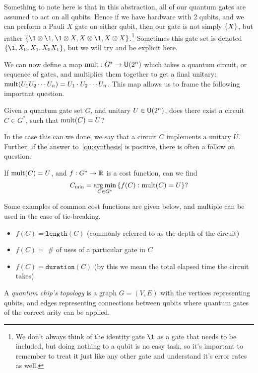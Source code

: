 Something to note here is that in this abstraction, all of our quantum gates are assumed to act on all qubits.
Hence if we have hardware with 2 qubits, and we can perform a Pauli $X$ gate on either qubit, then our gate is not simply $\qty{X}$, but rather $\qty{\1\otimes \1, \1\otimes X, X\otimes \1, X\otimes X}$.\footnote{We don't always think of the identity gate $\1$ as a gate that needs to be included, but doing nothing to a qubit is no easy task, so it's important to remember to treat it just like any other gate and understand it's error rates as well.}
Sometimes this gate set is denoted $\qty{\1, X_0, X_1, X_0X_1}$, but we will try and be explicit here.

We can now define a map $\operatorname{mult}: G^* \to \mathsf{U} (2^n)$ which takes a quantum circuit, or sequence of gates, and multiplies them together to get a final unitary: $\operatorname{mult}(U_1U_2\cdots U_n) = U_1\cdot U_2\cdots U_n$.
This map allows us to frame the following important question.

\begin{question}\label{qu:synthesis}
    Given a quantum gate set $G$, and unitary $U\in\mathsf{U} (2^n)$, does there exist a circuit $C\in G^*$, such that $\operatorname{mult}(C) = U$?
\end{question}
In the case this can we done, we say that a circuit $C$ implements a unitary $U$.
Further, if the answer to~\ref{qu:synthesis} is positive, there is often a follow on question.
\begin{question}\label{qu:optimalsynthesis}
    If $\operatorname{mult}(C) = U$, and $f: G^* \to \mathbb{R}$ is a cost function, can we find
    \begin{equation*}
        C_\text{min} = \operatorname*{arg\,min}_{C\in G^*} \qty{f(C) : \operatorname{mult}(C) = U}?
    \end{equation*}
\end{question}
Some examples of common cost functions are given below, and multiple can be used in the case of tie-breaking.
\begin{itemize}
    \item $f(C) = \mathtt{length}(C)$ (commonly referred to as the depth of the circuit)
    \item $f(C) = $ \# of uses of a particular gate in $C$
    \item $f(C) = \mathtt{duration}(C)$ (by this we mean the total elapsed time the circuit takes)
\end{itemize}

\begin{definition}
    A \emph{quantum chip's topology} is a graph $G = (V, E)$ with the vertices representing qubits, and edges representing connections between qubits where quantum gates of the correct arity can be applied.
\end{definition}

